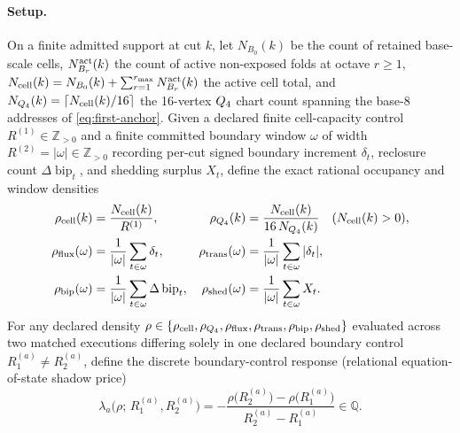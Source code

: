 \paragraph{Setup.}
On a finite admitted support at cut \(k\), let \(N_{B_0}(k)\) be the count of
retained base-scale cells, \(N^{\rm act}_{B_r}(k)\) the count of active
non-exposed folds at octave \(r\ge 1\),
\(N_{\rm cell}(k)=N_{B_0}(k)+\sum_{r=1}^{r_{\max}}N^{\rm act}_{B_r}(k)\) the
active cell total, and \(N_{Q_4}(k)=\lceil N_{\rm cell}(k)/16\rceil\) the
16-vertex \(Q_4\) chart count spanning the base-8 addresses of
\eqref{eq:first-anchor}. Given a declared finite cell-capacity control
\(R^{(1)}\in\mathbb Z_{>0}\) and a finite committed boundary window \(\omega\)
of width \(R^{(2)}=|\omega|\in\mathbb Z_{>0}\) recording per-cut signed
boundary increment \(\delta_t\), reclosure count \(\Delta\operatorname{bip}_t\),
and shedding surplus \(X_t\), define the exact rational occupancy and window
densities
\begin{equation}
 \begin{aligned}
 \rho_{\rm cell}(k)&=\frac{N_{\rm cell}(k)}{R^{(1)}}, &
 \rho_{Q_4}(k)&=\frac{N_{\rm cell}(k)}{16\,N_{Q_4}(k)}
 \quad(N_{\rm cell}(k)>0),\\
 \rho_{\rm flux}(\omega)&=\frac{1}{|\omega|}\sum_{t\in\omega}\delta_t, &
 \rho_{\rm trans}(\omega)&=\frac{1}{|\omega|}\sum_{t\in\omega}|\delta_t|,\\
 \rho_{\rm bip}(\omega)&=\frac{1}{|\omega|}\sum_{t\in\omega}\Delta\operatorname{bip}_t, &
 \rho_{\rm shed}(\omega)&=\frac{1}{|\omega|}\sum_{t\in\omega}X_t.
 \end{aligned}
 \label{eq:awareness-cell-density}
\end{equation}
For any declared density
\(\rho\in\{\rho_{\rm cell},\rho_{Q_4},\rho_{\rm flux},\rho_{\rm trans},\rho_{\rm bip},\rho_{\rm shed}\}\)
evaluated across two matched executions differing solely in one declared
boundary control \(R^{(a)}_1\ne R^{(a)}_2\), define the discrete
boundary-control response (relational equation-of-state shadow price)
\begin{equation}
 \lambda_a\bigl(\rho;\,R^{(a)}_1,R^{(a)}_2\bigr)
 =-\frac{\rho\bigl(R^{(a)}_2\bigr)-\rho\bigl(R^{(a)}_1\bigr)}{R^{(a)}_2-R^{(a)}_1}
 \in\mathbb Q.
 \label{eq:awareness-reos-response}
\end{equation}

